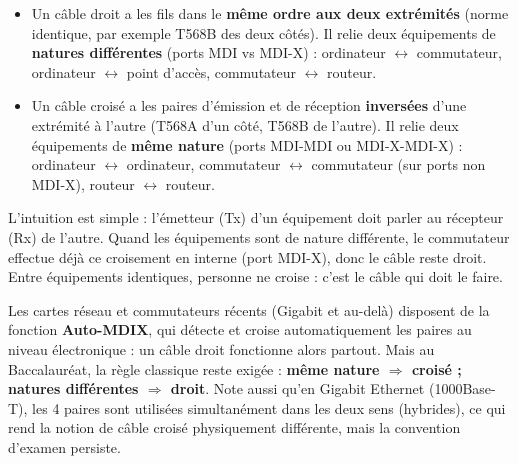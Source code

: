 \documentclass[11pt]{article}
\newcommand{\cle}[1]{{\popxbold\color{popdark}#1}}
\begin{document}
\begin{definition}
\begin{itemize}
  \item Un \cle{câble droit} a les fils dans le \textbf{même ordre aux deux extrémités} (norme identique, par exemple T568B des deux côtés). Il relie deux équipements de \textbf{natures différentes} (ports MDI vs MDI-X) : ordinateur $\leftrightarrow$ commutateur, ordinateur $\leftrightarrow$ point d'accès, commutateur $\leftrightarrow$ routeur.
  \item Un \cle{câble croisé} a les paires d'émission et de réception \textbf{inversées} d'une extrémité à l'autre (T568A d'un côté, T568B de l'autre). Il relie deux équipements de \textbf{même nature} (ports MDI-MDI ou MDI-X-MDI-X) : ordinateur $\leftrightarrow$ ordinateur, commutateur $\leftrightarrow$ commutateur (sur ports non MDI-X), routeur $\leftrightarrow$ routeur.
\end{itemize}
\end{definition}

L'intuition est simple : l'émetteur (Tx) d'un équipement doit parler au récepteur (Rx) de l'autre. Quand les équipements sont de nature différente, le commutateur effectue déjà ce croisement en interne (port MDI-X), donc le câble reste droit. Entre équipements identiques, personne ne croise : c'est le câble qui doit le faire.

\begin{attention}
Les cartes réseau et commutateurs récents (Gigabit et au-delà) disposent de la fonction \textbf{Auto-MDIX}, qui détecte et croise automatiquement les paires au niveau électronique : un câble droit fonctionne alors partout. Mais au Baccalauréat, la règle classique reste exigée : \textbf{même nature $\Rightarrow$ croisé ; natures différentes $\Rightarrow$ droit}. Note aussi qu'en Gigabit Ethernet (1000Base-T), les 4 paires sont utilisées simultanément dans les deux sens (hybrides), ce qui rend la notion de câble croisé physiquement différente, mais la convention d'examen persiste.
\end{attention}
\end{document}
